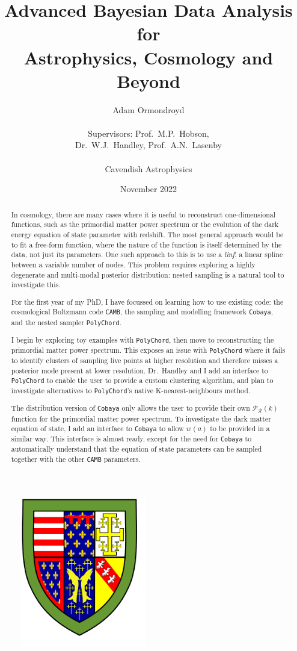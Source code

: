 \documentclass{article}
\title{Advanced Bayesian Data Analysis for \\ Astrophysics, Cosmology and Beyond}
\author{Adam Ormondroyd\\ \\Supervisors: Prof.~M.P.~Hobson, \\ Dr.~W.J.~Handley, Prof.~A.N.~Lasenby\\ \\Cavendish Astrophysics}
\date{November 2022}
\begin{document}
\setcounter{page}{0}
\maketitle

\begin{figure}[!h]
  \centering
  \includegraphics[width=5.5cm]{Queens'_shield.pdf}
  \label{fig:crest}
\end{figure}

\begin{abstract}

In cosmology, there are many cases where it is useful to reconstruct one-dimensional functions, such as the primordial matter power spectrum or the evolution of the dark energy equation of state parameter with redshift. The most general approach would be to fit a free-form function, where the nature of the function is itself determined by the data, not just its parameters. One such approach to this is to use a \textit{linf}: a linear spline between a variable number of nodes. This problem requires exploring a highly degenerate and multi-modal posterior distribution: nested sampling is a natural tool to investigate this.

For the first year of my PhD, I have focussed on learning how to use existing code: the cosmological Boltzmann code \texttt{CAMB}, the sampling and modelling framework \texttt{Cobaya}, and the nested sampler \texttt{PolyChord}.

I begin by exploring toy examples with \texttt{PolyChord}, then move to reconstructing the primordial matter power spectrum. This exposes an issue with \texttt{PolyChord} where it fails to identify clusters of sampling live points at higher resolution and therefore misses a posterior mode present at lower resolution. Dr.~Handley and I add an interface to \texttt{PolyChord} to enable the user to provide a custom clustering algorithm, and plan to investigate alternatives to \texttt{PolyChord}'s native K-nearest-neighbours method.

The distribution version of \texttt{Cobaya} only allows the user to provide their own $\mathcal P_\mathcal R(k)$ function for the primordial matter power spectrum. To investigate the dark matter equation of state, I add an interface to \texttt{Cobaya} to allow $w(a)$ to be provided in a similar way. This interface is almost ready, except for the need for \texttt{Cobaya} to automatically understand that the equation of state parameters can be sampled together with the other \texttt{CAMB} parameters.
\end{abstract}
\end{document}
